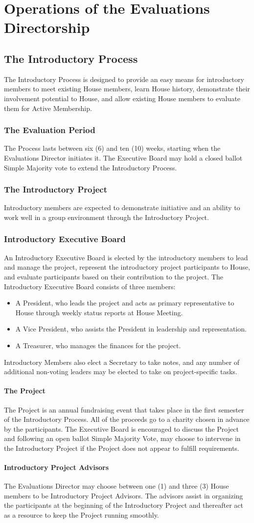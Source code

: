 \documentclass{article}
\newcommand{\bylaw}[1]{\section{#1} \label{#1}}
\newcommand{\bsection}[1]{\subsection{#1} \label{#1}}
\newcommand{\bsubsection}[1]{\subsubsection{#1} \label{#1}}
\newcommand{\bsubsubsection}[1]{\paragraph{#1} \label{#1}}
\begin{document}
\bylaw{Operations of the Evaluations Directorship}
\bsection{The Introductory Process}
The Introductory Process is designed to provide an easy means for introductory members to meet existing House members, learn House history, demonstrate their involvement potential to House, and allow existing House members to evaluate them for Active Membership.
\bsubsection{The Evaluation Period}
The Process lasts between six (6) and ten (10) weeks, starting when the Evaluations Director initiates it.
The Executive Board may hold a closed ballot Simple Majority vote to extend the Introductory Process.
\bsubsection{The Introductory Project}
Introductory members are expected to demonstrate initiative and an ability to work well in a group environment through the Introductory Project.
\bsubsection{Introductory Executive Board}
An Introductory Executive Board is elected by the introductory members to lead and manage the project, represent the introductory project participants to House, and evaluate participants based on their contribution to the project.
The Introductory Executive Board consists of three members:
\begin{itemize}
	\item A President, who leads the project and acts as primary representative to House through weekly status reports at House Meeting.
	\item A Vice President, who assists the President in leadership and representation.
	\item A Treasurer, who manages the finances for the project.
\end{itemize}
Introductory Members also elect a Secretary to take notes, and any number of additional non-voting leaders may be elected to take on project-specific tasks.
\bsubsubsection{The Project} 
The Project is an annual fundraising event that takes place in the first semester of the Introductory Process.
All of the proceeds go to a charity chosen in advance by the participants.
The Executive Board is encouraged to discuss the Project and following an open ballot Simple Majority Vote, may choose to intervene in the Introductory Project if the Project does not appear to fulfill requirements.
\bsubsubsection{Introductory Project Advisors} 
The Evaluations Director may choose between one (1) and three (3) House members to be Introductory Project Advisors.
The advisors assist in organizing the participants at the beginning of the Introductory Project and thereafter act as a resource to keep the Project running smoothly.
\end{document}
